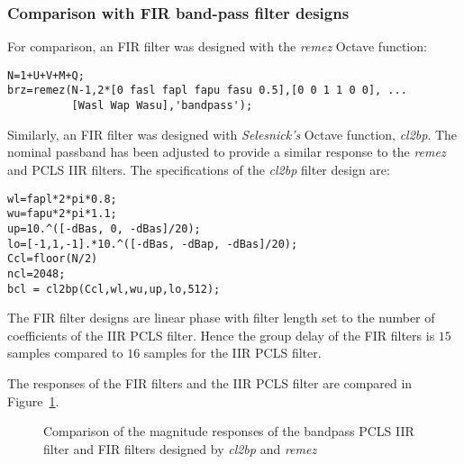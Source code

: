 \documentclass[a4paper,twoside,10pt,english]{report}
\begin{document}
\subsubsection{Comparison with FIR band-pass filter designs}
For comparison, an FIR filter was designed with the \emph{remez}
Octave function:
\begin{small}
\begin{verbatim}
N=1+U+V+M+Q;
brz=remez(N-1,2*[0 fasl fapl fapu fasu 0.5],[0 0 1 1 0 0], ...
          [Wasl Wap Wasu],'bandpass');
\end{verbatim}
\end{small}
Similarly,  an FIR filter was designed with \emph{Selesnick's}
Octave function, \emph{cl2bp}. The
nominal passband has been adjusted to provide a similar response to the
\emph{remez} and PCLS IIR filters. The specifications of the \emph{cl2bp}
filter design are:
\begin{small}
\begin{verbatim}
wl=fapl*2*pi*0.8;
wu=fapu*2*pi*1.1;
up=10.^([-dBas, 0, -dBas]/20);
lo=[-1,1,-1].*10.^([-dBas, -dBap, -dBas]/20);
Ccl=floor(N/2)
ncl=2048;
bcl = cl2bp(Ccl,wl,wu,up,lo,512);
\end{verbatim}
\end{small}
The FIR filter designs are linear phase with filter length set to the number of
coefficients of the IIR PCLS filter. Hence the group delay of the FIR filters
is $15$ samples compared to $16$ samples for the IIR PCLS filter. 

The responses of the FIR filters and the IIR PCLS filter are compared in
Figure~\ref{fig:iir-sqp-slb-bandpass-test-compare-magnitude}. 
\begin{figure}[!htbp]
\begin{center}
\scalebox{0.7}{}
\caption{Comparison of the magnitude responses of the bandpass PCLS IIR filter
 and FIR filters designed by \emph{cl2bp} and \emph{remez}}
\label{fig:iir-sqp-slb-bandpass-test-compare-magnitude}
\end{center}
\end{figure}
\clearpage
\end{document}
